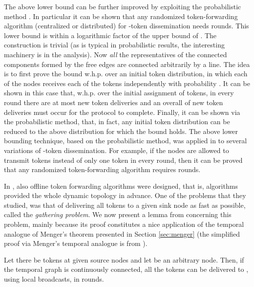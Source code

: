 \documentclass[oribibl, 11pt]{llncs}
\begin{document}
The above lower bound can be further improved by exploiting the probabilistic method \cite{DPRS13}. In particular it can be shown that any randomized token-forwarding algorithm (centralized or distributed) for -token dissemination needs  rounds. This lower bound is within a logarithmic factor of the  upper bound of \cite{KLO10}. The construction is trivial (as is typical in probabilistic results, the interesting machinery is in the analysis). Now \emph{all} the representatives of the connected components formed by the free edges are connected arbitrarily by a line. The idea is to first prove the bound w.h.p. over an initial token distribution, in which each of the nodes receives each of the  tokens independently with probability . It can be shown in this case that, w.h.p. over the initial assignment of tokens, in every round there are at most  new token deliveries and an overall of  new token deliveries must occur for the protocol to complete. Finally, it can be shown via the probabilistic method, that, in fact, any initial token distribution can be reduced to the above distribution for which the bound holds. The above lower bounding technique, based on the probabilistic method, was applied in \cite{HK12} to several variations of -token dissemination. For example, if the nodes are allowed to transmit  tokens instead of only one token in every round, then it can be proved that any randomized token-forwarding algorithm requires  rounds.

In \cite{DPRS13}, also offline token forwarding algorithms were designed, that is, algorithms provided the whole dynamic topology in advance. One of the problems that they studied, was that of delivering all tokens to a given sink node  as fast as possible, called the \emph{gathering problem}. We now present a lemma from \cite{DPRS13} concerning this problem, mainly because its proof constitutes a nice application of the temporal analogue of Menger's theorem presented in Section \ref{sec:menger} (the simplified proof via Menger's temporal analogue is from \cite{MMCS13}).

\begin{lemma} [DPRS13]
Let there be  tokens at given source nodes and let  be an arbitrary node. Then, if the temporal graph  is continuously connected, all the tokens can be delivered to , using local broadcasts, in  rounds.
\end{lemma}
\end{document}
